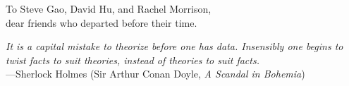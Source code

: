 \documentclass[12pt,chapterheads]{ucsd}
\begin{document}
\begin{frontmatter}
\makefrontmatter %

%
%


\begin{dedication} %
  To Steve Gao, David Hu, and Rachel Morrison, \\dear friends who departed before their time.
\end{dedication}

%   
% 



\begin{epigraph} %
  \emph{It is a capital mistake to theorize before one has data. Insensibly one begins to twist facts to suit theories, instead of theories to suit facts.}\\
  ---Sherlock Holmes (Sir Arthur Conan Doyle, \emph{A Scandal in Bohemia})\\
\end{epigraph}

% 


\end{frontmatter}
\end{document}

